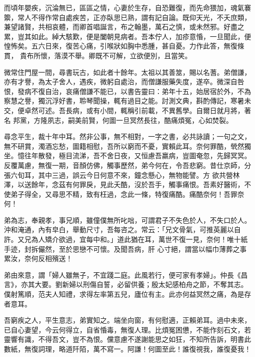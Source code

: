 \begin{pinyinscope}
 而頃年嬰疾，沉淪無已，區區之情，心妻於生存，自恐難復，而先命猥加，魂氣褰籞，常人不得作常自處疾苦，正亦臥思已熟，謂有記自論。既仰天光，不夭庶類，兼望諸賢，共相哀體，而卿首唱誕言，布之翰墨，萬石之慎，或未然邪。好盡之累，豈其如此。綽大駭歎，便是闔朝見病者。吾本佇人，加疹意惛，一旦聞此，便惶怖矣。五六日來，復苦心痛，引喉狀如胸中悉腫，甚自憂。力作此答，無復條貫，
 貴布所懷，落漠不舉。卿既不可解，立欲便別，且當笑。



 微常住門屋一間，尋書玩古，如此者十餘年。太祖以其善筮，賜以名蓍。弟僧謙，亦有才譽，為太子舍人，遇疾，微躬自處治，而僧謙服藥失度，遂卒。微深自咎恨，發病不復自治，哀痛僧謙不能已，以書告靈曰：弟年十五，始居宿於外，不為察慧之譽，獨沉浮好書，聆琴聞操，輒有過目之能。討測文典，斟酌傳記，寒暑未交，便卓然可述。吾長病，或有小間，輒稱引前載，不異舊學。自爾日就月將，著名
 邦黨，方隆夙志，嗣美前賢，何圖一旦冥然長往，酷痛煩冤，心如焚裂。



 尋念平生，裁十年中耳。然非公事，無不相對，一字之書，必共詠讀；一句之文，無不研賞，濁酒忘愁，圖籍相慰，吾所以窮而不憂，實賴此耳。奈何罪酷，煢然獨坐。憶往年散發，極目流涕，吾不舍日夜，又恒慮吾羸病，豈圖奄忽，先歸冥冥。反覆萬慮，無復一期，音顏仿佛，觸事歷然，弟今何在，令吾悲窮。昔仕京師，分張六旬耳，其中三過，誤云今日何意不來，鐘念懸心，無物能譬。方
 欲共營林澤，以送餘年，念茲有何罪戾，見此夭酷，沒於吾手，觸事痛恨。吾素好醫術，不使弟子得全，又尋思不精，致有枉過，念此一條，特復痛酷。痛酷奈何！吾罪奈何！



 弟為志，奉親孝，事兄順，雖僮僕無所叱咄，可謂君子不失色於人，不失口於人。沖和淹通，內有皁白，舉動尺寸，吾每咨之。常云：「兄文骨氣，可推英麗以自許。又兄為人矯介欲過，宜每中和。」道此猶在耳，萬世不復一見，奈何！唯十紙手迹，封拆儼然，至於思戀不可懷。及聞吾病，肝
 心寸絕，謂當以幅巾薄葬之事累汝，奈何反相殯送！



 弟由來意，謂「婦人雖無子，不宜踐二庭。此風若行，便可家有孝婦」。仲長《昌言》，亦其大要。劉新婦以刑傷自誓，必留供養；殷太妃感柏舟之節，不奪其志。僕射篤順，范夫人知禮，求得左率第五兒，廬位有主。此亦何益冥然之痛，為是存者意耳。



 吾窮疾之人，平生意志，弟實知之。端坐向窗，有何慰適，正賴弟耳。過中未來，已自心妻望，今云何得立，自省惛毒，無復人理。比煩冤困憊，不能作刻石文，若
 靈響有識，不得吾文，豈不為恨。儻意慮不遂謝能思之如狂，不知所告訴，明書此數紙，無復詞理，略道阡陌，萬不寫一。阿謙！何圖至此！誰復視我，誰復憂我！




\end{pinyinscope}
